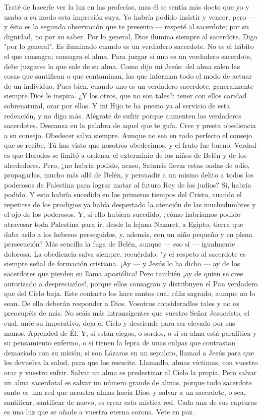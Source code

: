 \documentclass[12pt]{book} %
\begin{document}
Traté de hacerle ver la luz en las profecías, mas él se sentía más docto que yo y usaba a su modo esta impresión suya. Yo habría podido insistir y vencer, pero — y ésta es la segunda observación que te presento — respeté al sacerdote; por su dignidad, no por su saber. 
Por lo general, Dios ilumina siempre al sacerdote. Digo "por lo general". Es iluminado cuando es un verdadero 
sacerdote. No es el hábito el que consagra; consagra el alma. Para juzgar si uno es un verdadero sacerdote, debe juzgarse lo que sale de su alma. Como dijo mi Jesús: del alma salen las cosas que santifican o que contaminan, las que informan todo el modo de actuar de un individuo. Pues bien, cuando uno es un verdadero sacerdote, generalmente siempre Dios le inspira. ¿Y los otros, que no son tales?: tener con ellos caridad sobrenatural, orar por ellos. 
Y mi Hijo te ha puesto ya al servicio de esta redención, y no digo más. Alégrate de sufrir porque aumenten los verdaderos sacerdotes. 
Descansa en la palabra de aquel que te guía. Cree y presta obediencia a su consejo. Obedecer salva siempre. Aunque no 
sea en todo perfecto el consejo que se recibe. 
Tú has visto que nosotros obedecimos, y el fruto fue bueno. Verdad es que Herodes se limitó a ordenar el exterminio de 
los niños de Belén y de los alrededores. Pero, ¿no habría podido, acaso, Satanás llevar estas ondas de odio, propagarlas, mucho más allá de Belén, y persuadir a un mismo delito a todos los poderosos de Palestina para lograr matar al futuro Rey de los judíos? Sí, habría podido. Y esto habría sucedido en los primeros tiempos del Cristo, cuando el repetirse de los prodigios ya había despertado la atención de las muchedumbres y el ojo de los poderosos. Y, si ello hubiera sucedido, ¿cómo habríamos podido atravesar toda Palestina para ir, desde la lejana Nazaret, a Egipto, tierra que daba asilo a los hebreos perseguidos, y, además, con un niño pequeño y en plena persecución? Más sencilla la fuga de Belén, aunque — eso sí — igualmente dolorosa. 
La obediencia salva siempre, recuérdalo; "y el respeto al sacerdote es siempre señal de formación cristiana. ¡Ay — y Jesús lo ha dicho — ay de los sacerdotes que pierden su llama apostólica! Pero también ¡ay de quien se cree autorizado a despreciarlos!, porque ellos consagran y distribuyen el Pan verdadero que del Cielo baja. Este contacto los hace santos cual cáliz sagrado, aunque no lo sean. De ello deberán responder a Dios. Vosotros consideradlos tales y no os preocupéis de más. No seáis más intransigentes que vuestro Señor Jesucristo, el cual, ante su imperativo, deja el Cielo y desciende para ser elevado por sus manos. Aprended de Él. Y, si están ciegos, o sordos, o si su alma está paralítica y su pensamiento enfermo, o si tienen la lepra de unas culpas que contrastan demasiado con su misión, si son Lázaros en un sepulcro, llamad a Jesús para que les devuelva la salud, para que los resucite. 
Llamadlo, almas víctimas, con vuestro orar y vuestro sufrir. Salvar un alma es predestinar al Cielo la propia. Pero salvar 
un alma sacerdotal es salvar un número grande de almas, porque todo sacerdote santo es una red que arrastra almas hacia Dios, y salvar a un sacerdote, o sea, santificar, santificar de nuevo, es crear esta mística red. Cada una de sus capturas es una luz que se añade a vuestra eterna corona. 
Vete en paz. 
 
\end{document}
